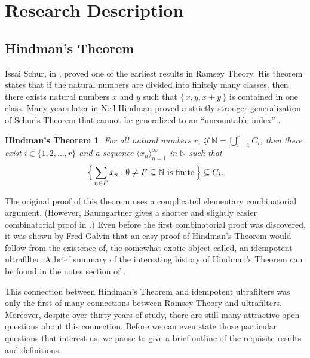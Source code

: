 \documentclass[12pt]{article}
\theoremstyle{plain}
\newtheorem{fst}[thm]{Hindman's Theorem}
\theoremstyle{definition}
\newcommand{\bbN}{\mathbb{N}}
\newcommand{\la}{\langle}
\newcommand{\ra}{\rangle}
\begin{document}
\section{Research Description}
\subsection{Hindman's Theorem}
Issai Schur, in \cite{Schur:1916fk}, proved one of the earliest
results in Ramsey Theory. 
His theorem states that if the natural numbers are divided into
finitely many classes, then there exists natural numbers $x$ and $y$
such that $\{\, x, y, x+y \,\}$ is contained in one class.
Many years later in \cite{Hindman:1974ys} Neil Hindman proved a
strictly stronger generalization of Schur's Theorem \cite[Theorems
16.28 and 16.29]{Hindman:1998fk} that cannot be generalized to an
``uncountable index'' \cite{Milliken:1978fk}. 

\begin{fst}
  For all natural numbers $r$, if \/ $\bbN = \bigcup_{i=1}^r C_i$, then
  there exist $i \in \{1, 2, \ldots, r\}$ and a sequence $\la x_n
  \ra_{n=1}^\infty$ in $\bbN$ such that
    \[
      \Bigl\{\, \sum_{n\in F} x_n : \emptyset \ne F \subseteq \bbN
      \hbox{ is finite} \,\Bigr\} \subseteq C_i.
    \]
\end{fst}

The original proof of this theorem uses a complicated elementary
combinatorial argument. 
(However, Baumgartner gives a shorter and slightly easier
combinatorial proof in \cite{Baumgartner:1974uq}.)
Even before the first combinatorial proof was discovered, it was shown
by Fred Galvin that an easy proof of Hindman's Theorem would follow
from the existence of, the somewhat exotic object called, an idempotent
ultrafilter. 
A brief summary of the interesting history of Hindman's Theorem can be
found in the notes section of \cite[Chapter 5]{Hindman:1998fk}. 

This connection between Hindman's Theorem and idempotent ultrafilters
was only the first of many connections between Ramsey Theory and
ultrafilters.
Moreover, despite over thirty years of study, there are still many
attractive open questions about this connection.
Before we can even state those particular questions that interest us,
we pause to give a brief outline of the requisite results and
definitions. 
\end{document}
